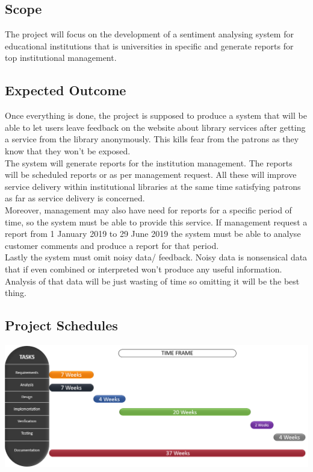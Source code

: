 \documentclass[12pt]{report}
\begin{document}
	\subsection{Scope}
	The project will focus on the development of a sentiment analysing system for educational institutions that is universities in specific and generate reports for top institutional management.
	\subsection{Expected Outcome}
	Once everything is done, the project is supposed to produce a system that will be able to let users leave feedback on the website about library services after getting a service from the library anonymously. This kills fear from the patrons as they know that they won’t be exposed.\\
	The system will generate reports for the institution management. The reports will be scheduled reports or as per management request. All these will improve service delivery within institutional libraries at the same time satisfying patrons as far as service delivery is concerned.\\
	Moreover, management may also have need for reports for a specific period of time, so the system must be able to provide this service. If management request a report from 1 January 2019 to 29 June 2019 the system must be able to analyse customer comments and produce a report for that period.\\
	
	Lastly the system must omit noisy data/ feedback. Noisy data is nonsensical data that if even combined or interpreted won’t produce any useful information. Analysis of that data will be just wasting of time so omitting it will be the best thing.
	
	\subsection{Project Schedules}
	
	\includegraphics[scale=0.5]{gant.png}
	
\end{document}
